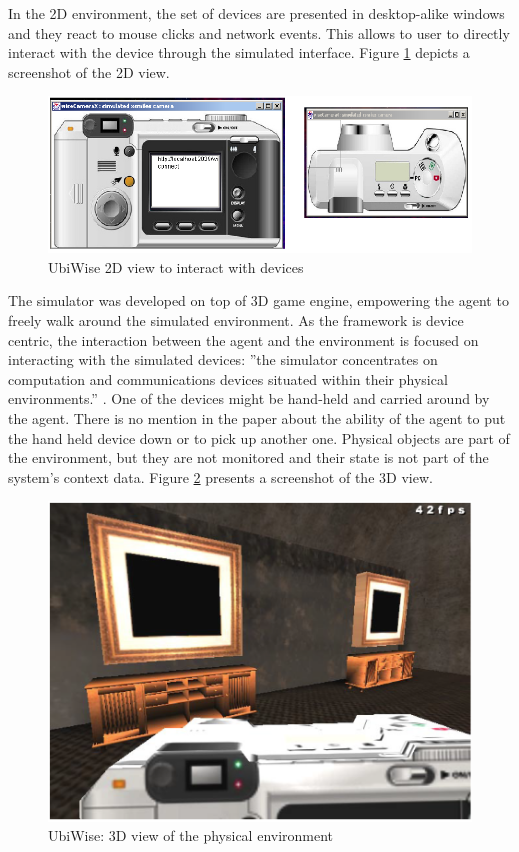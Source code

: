 In the 2D environment, the set of devices are presented in desktop-alike windows and they react to mouse clicks and network events. This allows to user to directly interact with the device through the simulated interface. Figure \ref{fig:ubiwise_2d_view} depicts a screenshot of the 2D view.\\
\begin{figure}[H]
	\centering
	\includegraphics[width=\linewidth]{gfx/Chapter2/ubiwise_2d_view}
	\caption{UbiWise 2D view to interact with devices}
	\label{fig:ubiwise_2d_view}
\end{figure}

The simulator was developed on top of 3D game engine, empowering the agent to freely walk around the simulated environment. As the framework is device centric, the interaction between the agent and the environment is focused on interacting with the simulated devices: ''the simulator concentrates on computation and communications devices
situated within their physical environments.'' \cite{barton2003ubiwise}. One of the devices might be hand-held and carried around by the agent. There is no mention in the paper about the ability of the agent to put the hand held device down or to pick up another one. Physical objects are part of the environment, but they are not monitored and their state is not part of the system's context data. Figure \ref{fig:ubiwise_3d_view} presents a screenshot of the 3D view.\\
\begin{figure}[H]
	\centering
	\includegraphics[width=\linewidth]{gfx/Chapter2/ubiwise_3d_view}
	\caption{UbiWise: 3D view of the physical environment}
	\label{fig:ubiwise_3d_view}
\end{figure}

